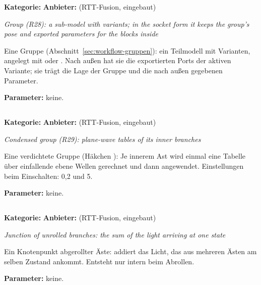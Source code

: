 \textbf{Kategorie:}  \quad \textbf{Anbieter:}  (RTT-Fusion, eingebaut)

\textit{Group (R28): a sub-model with variants; in the socket form it keeps the group's pose and exported parameters for the blocks inside}

Eine Gruppe (Abschnitt~\ref{sec:workflow-gruppen}): ein Teilmodell mit Varianten, angelegt mit
 oder . Nach außen hat sie die exportierten
Ports der aktiven Variante; sie trägt die Lage der Gruppe und die nach außen gegebenen Parameter.

\textbf{Parameter:} keine.

\subsection{}\label{sec:block-fusion-condensed}

\textbf{Kategorie:}  \quad \textbf{Anbieter:}  (RTT-Fusion, eingebaut)

\textit{Condensed group (R29): plane-wave tables of its inner branches}

Eine verdichtete Gruppe (Häkchen ): Je innerem Ast wird einmal
eine Tabelle über einfallende ebene Wellen gerechnet und dann angewendet. Einstellungen beim
Einschalten:  0{,}2 und  5.

\textbf{Parameter:} keine.

\subsection{}\label{sec:block-fusion-sum}

\textbf{Kategorie:}  \quad \textbf{Anbieter:}  (RTT-Fusion, eingebaut)

\textit{Junction of unrolled branches: the sum of the light arriving at one state}

Ein Knotenpunkt abgerollter Äste: addiert das Licht, das aus mehreren Ästen am selben Zustand
ankommt. Entsteht nur intern beim Abrollen.

\textbf{Parameter:} keine.

